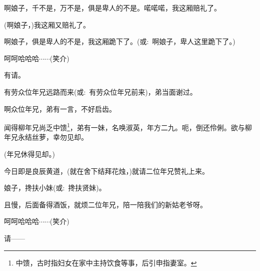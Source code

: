 {{啊娘子，千不是，万不是，俱是卑人的不是。喏喏喏，我这厢赔礼了。}

{(啊娘子，)我这厢又赔礼了。}

{啊娘子，俱是卑人的不是，我这厢跪下了。({\akai 或}:~啊娘子，卑人这里跪下了。)}



{呵呵哈哈哈$\cdots{}\cdots{}$({\hwfs 笑介})}


{\vspace{5pt}}

{有请。}

{有劳众位年兄远路而来({\akai 或}:~有劳众位年兄前来)，弟当面谢过。}

{啊众位年兄，弟有一言，不好启齿。}

{闻得柳年兄尚乏中馈\footnote{中馈，古时指妇女在家中主持饮食等事，后引申指妻室。}，弟有一妹，名唤淑英，年方二九。呃，倒还伶俐。欲与柳年兄永结丝萝，幸勿见却。}

{(年兄休得见却。)}

{今日即是良辰黄道，(就在舍下结拜花烛，)就请二位年兄赞礼上来。}

{娘子，搀扶小妹({\akai 或}:~搀扶贤妹)。}

{且慢，后面备得酒饭，就烦二位年兄，陪一陪我们的新姑老爷呀。}

{呵呵哈哈哈$\cdots{}\cdots{}$({\hwfs 笑介})}

{请------}

}
